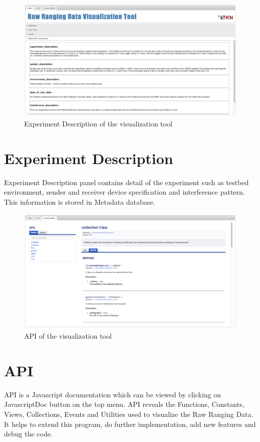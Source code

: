\documentclass[11pt,a4paper,headinclude,footinclude,chapterprefix=on]{scrreprt}
\begin{document}
\begin{figure}
	[!h] \centering 
	\includegraphics[width=15cm]{Images/tool_des.png} \caption{Experiment Description of the visualization tool} \label{fig:tool:des} 
\end{figure}

\section{Experiment Description} 
Experiment Description panel contains detail of the experiment such as testbed environment, sender and receiver device specification and interference pattern. This information is stored in Metadata database. 

\begin{figure}
	[!h] \centering 
	\includegraphics[width=15cm]{Images/tool_jsDoc.png} \caption{API of the visualization tool} \label{fig:tool:jsDoc} 
\end{figure}

\section{API} 
API is a Javascript documentation which can be viewed by clicking on JavascriptDoc button on the top menu. API reveals the Functions, Constants, Views, Collections, Events and Utilities used to visualize the Raw Ranging Data. It helps to extend this program, do further implementation, add new features and debug the code. 
\end{document}
